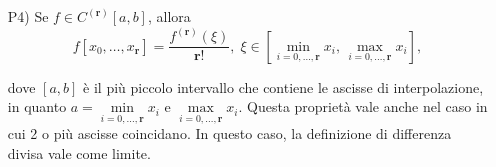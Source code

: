 \begin{property}
\begin{itemize}
		\item[P4)] Se $f\in C^{(\boldsymbol r)}[a,b]$, allora
		\begin{equation}\label{eq:P4_differenze_divise}
			f[x_0,\hdots, x_{\boldsymbol r}]=\frac{f^{(\boldsymbol r)}(\xi)}{\boldsymbol r!},\; \xi\in \left[\underset{i=0,\hdots,\boldsymbol r}{\min}x_i,\, \underset{i=0,\hdots,\boldsymbol r}{\max}x_i\right],
		\end{equation}
		
		dove $[a,b]$ è il più piccolo intervallo che contiene le ascisse di interpolazione, in quanto $a=\underset{i=0,\hdots,\boldsymbol r}{\min}x_i$ e $\underset{i=0,\hdots,\boldsymbol r}{\max}x_i$. Questa proprietà vale anche nel caso in cui 2 o più ascisse coincidano. In questo caso, la definizione di differenza divisa vale come limite.
		

\end{itemize}
\end{property}
